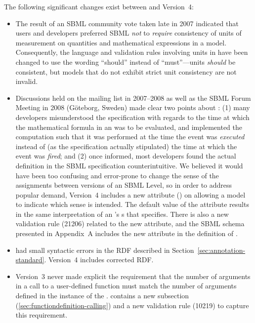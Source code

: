 The following significant changes exist between \sbmltwothree and
Version~4:
\begin{itemize}

\item The result of an SBML community vote taken late in 2007
  indicated that users and developers preferred SBML \emph{not} to
  \emph{require} consistency of units of measurement on quantities
  and mathematical expressions in a model.  Consequently, the
  language and validation rules involving units in \sbmltwofour
  have been changed to use the wording ``should'' instead of
  ``must''---units \emph{should} be consistent, but models that do
  not exhibit strict unit consistency are not invalid.

\item Discussions held on the
   mailing
  list in 2007--2008 as well as the SBML Forum Meeting in 2008
  (G\"{o}teborg, Sweden) made clear two points about \Event: (1)
  many developers misunderstood the specification with regards to
  the time at which the mathematical formula in an
  \EventAssignment was to be evaluated, and implemented the
  computation such that it was performed at the time the event was
  \emph{executed} instead of (as the specification actually
  stipulated) the time at which the event was \emph{fired}; and
  (2) once informed, most developers found the actual definition
  in the SBML specification counterintuitive.  We believed it
  would have been too confusing and error-prone to change the
  sense of the assignments between versions of an SBML Level, so
  in order to address popular demand, Version~4 includes a new
  attribute () on \Event allowing
  a model to indicate which sense is intended.  The default value
  of the  attribute results in the
  same interpretation of an \Event's \EventAssignment{}s that
  \sbmltwothree specifies.  There is also a new validation rule
  (21206) related to the new attribute, and the SBML schema
  presented in Appendix~A includes the new
   attribute in the definition of
  \Event.

\item \sbmltwothree had small syntactic errors in the RDF
  described in Section~\ref{sec:annotation-standard}.  Version~4
  includes corrected RDF.

\item Version~3 never made explicit the requirement that the
  number of arguments in a call to a user-defined function must
  match the number of arguments defined in the instance of the
  \FunctionDefinition.  \sbmltwofour contains a new subsection
  (\ref{sec:functiondefinition-calling}) and a new validation rule
  (10219) to capture this requirement.


\end{itemize}
